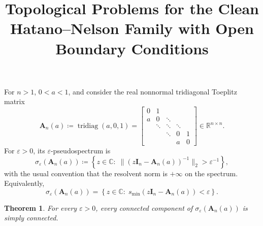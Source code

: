 \documentclass[11pt]{article}
\title{Topological Problems for the Clean Hatano--Nelson Family with Open Boundary Conditions}
\author{}
\date{}
\newtheorem{theorem}{Theorem}
\begin{document}
\maketitle

For \(n>1\), \(0<a<1\), and consider the real nonnormal tridiagonal Toeplitz matrix \[ \mathbf A_n(a)\coloneqq\operatorname{tridiag}(a,0,1) = \begin{bmatrix} 0 & 1 \\ a & 0 & \ddots \\ & \ddots & \ddots & \ddots \\ && \ddots & 0 & 1 \\ &&& a & 0 \end{bmatrix}\in \mathbb{R}^{n\times n}. \] For \(\varepsilon>0\), its \(\varepsilon\)-pseudospectrum is \[ \sigma_\varepsilon(\mathbf A_n(a)) \coloneqq \left\{ z\in\mathbb{C}\colon\; \|(z\mathbf I_n-\mathbf A_n(a))^{-1}\|_2>\varepsilon^{-1} \right\}, \] with the usual convention that the resolvent norm is \(+\infty\) on the spectrum. Equivalently, \[ \sigma_\varepsilon(\mathbf A_n(a)) = \left\{ z\in\mathbb{C}\colon\; s_{\min}(z\mathbf I_n-\mathbf A_n(a))<\varepsilon \right\}. \]

\begin{theorem}\label{thm:components-simply-connected}
For every \(\varepsilon>0\), every connected component of
\(\sigma_\varepsilon(\mathbf A_n(a))\)
is simply connected.
\end{theorem}
\end{document}
